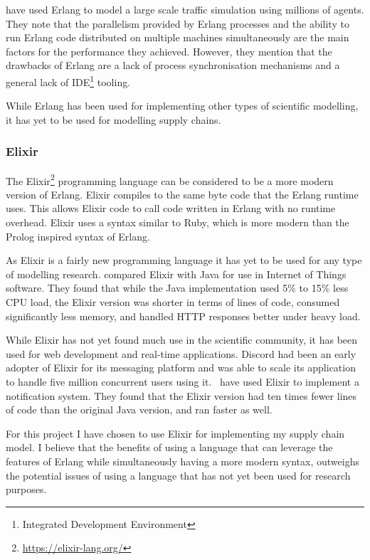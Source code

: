  have used Erlang to model a large scale traffic simulation using millions of agents.
They note that the parallelism provided by Erlang processes and the ability to run Erlang code distributed on multiple machines simultaneously are the main factors for the performance they achieved.
However, they mention that the drawbacks of Erlang are a lack of process synchronisation mechanisms and a general lack of IDE\footnote{Integrated Development Environment} tooling.

While Erlang has been used for implementing other types of scientific modelling, it has yet to be used for modelling supply chains.

\subsubsection{Elixir}

The Elixir\footnote{\url{https://elixir-lang.org/}} programming language can be considered to be a more modern version of Erlang.
Elixir compiles to the same byte code that the Erlang runtime uses.
This allows Elixir code to call code written in Erlang with no runtime overhead.
Elixir uses a syntax similar to Ruby, which is more modern than the Prolog inspired syntax of Erlang.~\cite{loder2016erlang}

As Elixir is a fairly new programming language it has yet to be used for any type of modelling research.
 compared Elixir with Java for use in Internet of Things software.
They found that while the Java implementation used 5\% to 15\% less CPU load, the Elixir version was shorter in terms of lines of code, consumed significantly less memory, and handled HTTP responses better under heavy load.

While Elixir has not yet found much use in the scientific community, it has been used for web development and real-time applications.
Discord had been an early adopter of Elixir for its messaging platform and was able to scale its application to handle five million concurrent users using it.~\cite{vishnevskiy2017discord}
 have used Elixir to implement a notification system.
They found that the Elixir version had ten times fewer lines of code than the original Java version, and ran faster as well.

For this project I have chosen to use Elixir for implementing my supply chain model.
I believe that the benefits of using a language that can leverage the features of Erlang while simultaneously having a more modern syntax, outweighs the potential issues of using a language that has not yet been used for research purposes.

